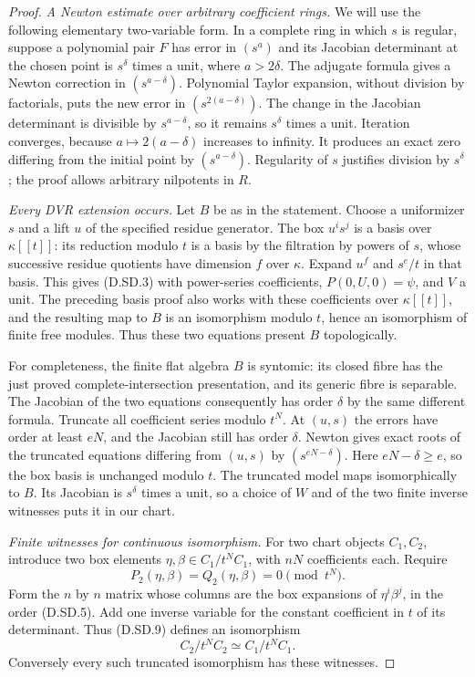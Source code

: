 \begin{proof}
\emph{A Newton estimate over arbitrary coefficient rings.}
We will use the following elementary two-variable form.
In a complete ring in which $s$ is regular, suppose a polynomial
pair $F$ has error in $(s^a)$ and its Jacobian determinant at
the chosen point is $s^\delta$ times a unit, where $a>2\delta$.
The adjugate formula gives a Newton correction in
$(s^{a-\delta})$.  Polynomial Taylor expansion, without
division by factorials, puts the new error in
$(s^{2(a-\delta)})$.
The change in the Jacobian determinant is divisible by
$s^{a-\delta}$, so it remains $s^\delta$ times a unit.
Iteration converges, because
$a\mapsto2(a-\delta)$ increases to infinity.
It produces an exact zero differing from the initial point
by $(s^{a-\delta})$.  Regularity of $s$ justifies division by
$s^\delta$; the proof allows arbitrary nilpotents in $R$.

\emph{Every DVR extension occurs.}
Let $B$ be as in the statement.  Choose a uniformizer $s$ and
a lift $u$ of the specified residue generator.  The box
$u^is^j$ is a basis over $\kappa[[t]]$: its reduction modulo
$t$ is a basis by the filtration by powers of $s$, whose
successive residue quotients have dimension $f$ over $\kappa$.
Expand $u^f$ and $s^e/t$ in that basis.  This gives (D.SD.3)
with power-series coefficients, $P(0,U,0)=\psi$, and $V$ a unit.
The preceding basis proof also works with these coefficients
over $\kappa[[t]]$, and the resulting map to $B$ is an
isomorphism modulo $t$, hence an isomorphism of finite free
modules.  Thus these two equations present $B$ topologically.

For completeness, the finite flat algebra $B$ is syntomic:
its closed fibre has the just proved complete-intersection
presentation, and its generic fibre is separable.
The Jacobian of the two equations consequently has order
$\delta$ by the same different formula.
Truncate all coefficient series modulo $t^N$.
At $(u,s)$ the errors have order at least $eN$, and the
Jacobian still has order $\delta$.
Newton gives exact roots of the truncated equations differing
from $(u,s)$ by $(s^{eN-\delta})$.
Here $eN-\delta\ge e$, so the box basis is unchanged modulo
$t$.  The truncated model maps isomorphically to $B$.
Its Jacobian is $s^\delta$ times a unit, so a choice of $W$
and of the two finite inverse witnesses puts it in our chart.

\emph{Finite witnesses for continuous isomorphism.}
For two chart objects $C_1,C_2$, introduce two box elements
$\eta,\beta\in C_1/t^NC_1$, with $nN$ coefficients each.
Require
\[
                     P_2(\eta,\beta)=Q_2(\eta,\beta)=0
                                             \pmod {t^N}.\tag{D.SD.9}
\]
Form the $n$ by $n$ matrix whose columns are the box expansions
of $\eta^i\beta^j$, in the order (D.SD.5).
Add one inverse variable for the constant coefficient in $t$
of its determinant.  Thus (D.SD.9) defines an isomorphism
\[
                         C_2/t^NC_2\simeq C_1/t^NC_1.    \tag{D.SD.10}
\]
Conversely every such truncated isomorphism has these witnesses.


\end{proof}
